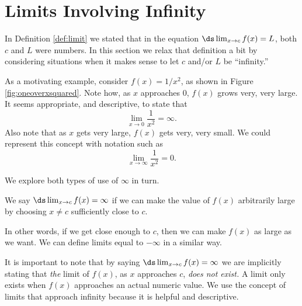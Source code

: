 \section{Limits Involving Infinity}\label{sec:limits_infty}

In Definition \ref{def:limit} we stated that in the equation $\ds \lim_{x\to c}f(x) = L$, both $c$ and $L$ were numbers. In this section we relax that definition a bit by considering situations when it makes sense to let $c$ and/or $L$ be ``infinity.''

As a motivating example, consider $f(x) = 1/x^2$, as shown in Figure \ref{fig:oneoverxsquared}. Note how, as $x$ approaches 0, $f(x)$ grows very, very large. It seems appropriate, and descriptive, to state that 
\[
\lim_{x\rightarrow 0} \frac1{x^2}=\infty.
\]
Also note that as $x$ gets very large, $f(x)$ gets very, very small. We could represent this concept with notation such as 
\[
\lim_{x\rightarrow \infty} \frac1{x^2}=0.
\]


We explore both types of use of $\infty$ in turn.

{We say $\ds \lim_{x\rightarrow c} f(x)=\infty$ if we can make the value of $f(x)$ arbitrarily large by choosing $x\neq c$ sufficiently close to $c$.   
}


In other words, if we get close enough to $c$, then we can make $f(x)$ as large as we want.  We can define limits equal to $-\infty$ in a similar way.

It is important to note that by saying $\ds \lim_{x\to c}f(x) = \infty$ we are implicitly stating that \textit{the} limit of $f(x)$, as $x$ approaches $c$, \textit{does not exist.} A limit only exists when $f(x)$ approaches an actual numeric value. We use the concept of limits that approach infinity because it is helpful and descriptive.\\


